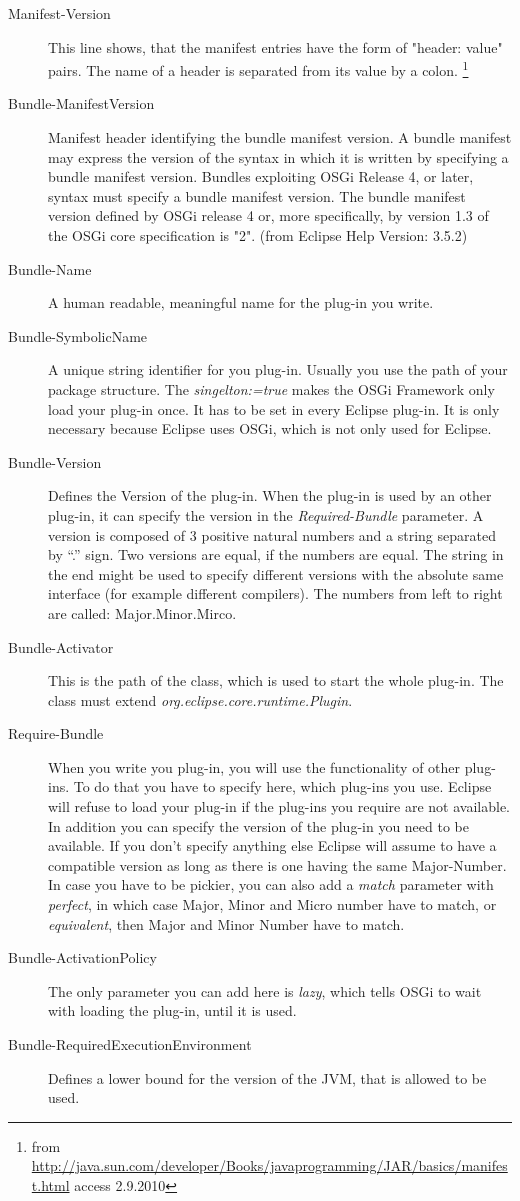 \documentclass[a4paper,10pt]{report}
\begin{document}
\begin{description}
 \item[Manifest-Version] This line shows, that the manifest entries have the form of "header: value" pairs.
The name of a header is separated from its value by a colon. \footnote{from \href{ http://java.sun.com/developer/Books/javaprogramming/JAR/basics/manifest.html}{ http://java.sun.com/developer/Books/javaprogramming/JAR/basics/manifest.html} access 2.9.2010}
 \item[Bundle-ManifestVersion] Manifest header identifying the bundle manifest version.
A bundle manifest may express the version of the syntax in which it is written by specifying a bundle manifest version.
Bundles exploiting OSGi Release 4, or later, syntax must specify a bundle manifest version. 
The bundle manifest version defined by OSGi release 4 or, more specifically, by version 1.3 of the OSGi core specification is "2".
(from Eclipse Help Version: 3.5.2)
 \item[Bundle-Name] A human readable, meaningful name for the plug-in you write.
 \item[Bundle-SymbolicName] A unique string identifier for you plug-in. Usually you use the path of your package structure.
The {\it singelton:=true} makes the OSGi Framework only load your plug-in once. It has to be set in every Eclipse plug-in.
It is only necessary because Eclipse uses OSGi, which is not only used for Eclipse.
 \item[Bundle-Version] Defines the Version of the plug-in. When the plug-in is used by an other plug-in, it can specify the version in the {\it Required-Bundle} parameter.
A version is composed of 3 positive natural numbers and a string separated by ``.'' sign. Two versions are equal, if the numbers are equal.
The string in the end might be used to specify different versions with the absolute same interface (for example different compilers).
The numbers from left to right are called: Major.Minor.Mirco.
 \item[Bundle-Activator] This is the path of the class, which is used to start the whole plug-in.
The class must extend {\it org.eclipse.core.runtime.Plugin}. 
 \item[Require-Bundle] When you write you plug-in, you will use the functionality of other plug-ins.
To do that you have to specify here, which plug-ins you use. Eclipse will refuse to load your plug-in if the plug-ins you require are not available.
In addition you can specify the version of the plug-in you need to be available.
If you don't specify anything else Eclipse will assume to have a compatible version as long as there is one having the same Major-Number.
In case you have to be pickier, you can also add a {\it match} parameter with {\it perfect}, in which case Major, Minor and Micro number have to match, or {\it equivalent}, then Major and Minor Number have to match.
 \item[Bundle-ActivationPolicy] The only parameter you can add here is {\it lazy}, which tells OSGi to wait with loading the plug-in, until it is used.
 \item[Bundle-RequiredExecutionEnvironment] Defines a lower bound for the version of the JVM, that is allowed to be used.
 \end{description}
\end{document}
